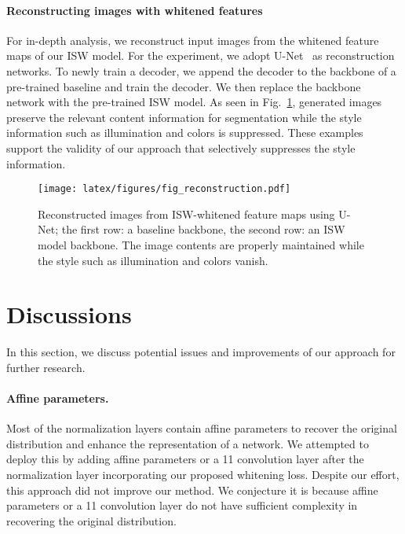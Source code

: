 \documentclass[final]{latex/cvpr}
\begin{document}
\vspace*{-0.45cm}
\paragraph{Reconstructing images with whitened features} For in-depth analysis, we reconstruct input images from the whitened feature maps of our ISW model. For the experiment, we adopt U-Net~\cite{ronneberger2015u} as reconstruction networks. To newly train a decoder, we append the decoder to the backbone of a pre-trained baseline and train the decoder. We then replace the backbone network with the pre-trained ISW model. As seen in Fig.~\ref{fig:reconstruction}, generated images preserve the relevant content information for segmentation while the style information such as illumination and colors is suppressed. These examples support the validity of our approach that selectively suppresses the style information.



\begin{figure}[t!]
\begin{center}
  \texttt{[image: latex/figures/fig\_reconstruction.pdf]}
\end{center}
\vspace*{-0.3cm}
   \caption{Reconstructed images from ISW-whitened feature maps using U-Net; the first row: a baseline backbone, the second row: an ISW model backbone. The image contents are properly maintained while the style such as illumination and colors vanish.}
\label{fig:reconstruction}
\vspace*{-0.45cm}
\end{figure}

\vspace{-0.1cm}
\section{Discussions}
\vspace{-0.1cm}
In this section, we discuss potential issues and improvements of our approach for further research. \vspace{-10pt}
\vspace{-0.1cm}
\paragraph{Affine parameters.} Most of the normalization layers contain affine parameters to recover the original distribution and enhance the representation of a network. We attempted to deploy this by adding affine parameters or a 11 convolution layer after the normalization layer incorporating our proposed whitening loss. Despite our effort, this approach did not improve our method. We conjecture it is because affine parameters or a 11 convolution layer do not have sufficient complexity in recovering the original distribution.\vspace{-20pt}
\vspace{-0.1cm}
\end{document}
